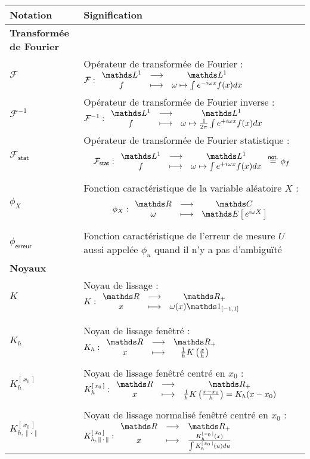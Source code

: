 \begin{tabularx}{\linewidth}{lX}
	\toprule
	\textbf{Notation} & \textbf{Signification}                                                                                                                                                                                   \\
	\midrule
	\textbf{Transformée de Fourier} & \\
	\midrule
	$\mathcal F$ & Opérateur de transformée de Fourier : $\mathcal F : \func{\mathds L^1}{\mathds L^1}{f}{\omega \mapsto \int e^{-i \omega x} f(x) dx}$ \\
	$\mathcal F^{-1}$ & Opérateur de transformée de Fourier inverse : \linebreak $\mathcal F^{-1} : \func{\mathds L^1}{\mathds L^1}{f}{\omega \mapsto \frac 1 {2\pi}\int e^{+i \omega x} f(x) dx}$ \\
	$\mathcal F_{\textsf{stat}}$ & Opérateur de transformée de Fourier \og statistique \fg : \linebreak $$\mathcal F_{\textsf{stat}} : \func{\mathds L^1}{\mathds L^1}{f}{\omega \mapsto \int e^{+i \omega x} f(x) dx} \overset{\textsf{not.}}{=} \phi_f$$ \\
	$\phi_X$ & Fonction caractéristique de la variable aléatoire $X$ : \linebreak $$\phi_X : \func{\grandR}{\mathds C}{\omega}{\esperance{e^{i \omega X}}}$$ \\
	$\phi_{\textsf{erreur}}$ & Fonction caractéristique de l'erreur de mesure $U$ aussi appelée $\phi_u$ quand il n'y a pas d'ambiguïté
	\\
	\midrule
	\textbf{Noyaux}
	                  &
	\\
	\midrule
	$K$
	                  & Noyau de lissage : $K : \func{\grandR}{\Rplus}{x}{\omega(x)\indicatrice{[-1,1]}}$
	\\\\
	\midrule
	\\
	$K_h$
	                  & Noyau de lissage fenêtré : $K_h : \func{\grandR}{\Rplus}{x}{\frac 1 h K\left( \frac{x}{h} \right)}$
	\\\\
	$K_h^{[\,x_0\,]}$
	                  & Noyau de lissage fenêtré centré en $x_0$ : $K_h^{[\,x_0\,]} : \func{\grandR}{\Rplus}{x}{\frac 1 h K\left( \frac{x-x_0}{h} \right) = K_h(x-x_0)}$
	\\\\
	$K_{h,\, \Vert \,  \cdot \, \Vert}^{[\,x_0\,]}$
	                  & Noyau de lissage normalisé fenêtré centré en $x_0$ : $K_{h,\, \Vert \,  \cdot \, \Vert}^{[\,x_0\,]} : \func{\grandR}{\Rplus}{x}{\frac{K_h^{[\,x_0\,]}(x)}{\int K_h^{[\,x_0\,]}(u) du}}$

\end{tabularx}
